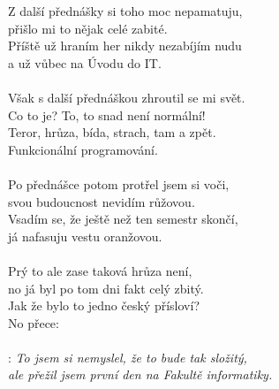 \newpage
Z další přednášky si toho moc nepamatuju,\\
přišlo mi to nějak celé zabité.\\
Příště už hraním her nikdy nezabíjím nudu\\
a už vůbec na Úvodu do IT.
\hspace{1cm}\textregistered\\
\\
Však s další přednáškou zhroutil se mi svět.\\
Co to je? To, to snad není normální!\\
Teror, hrůza, bída, strach, tam a zpět.\\
Funkcionální programování.
\hspace{1cm}\textregistered\\
\\
Po přednášce potom protřel jsem si voči,\\
svou budoucnost nevidím růžovou.\\
Vsadím se, že ještě než ten semestr skončí,\\
já nafasuju vestu oranžovou.\\
\\
Prý to ale zase taková hrůza není,\\
no já byl po tom dni fakt celý zbitý.\\
Jak že bylo to jedno český přísloví?\\
No přece: \\
\\
\textregistered:
\emph{To jsem si nemyslel, že to bude tak složitý,\\
ale přežil jsem první den na Fakultě informatiky.}

\newpage
